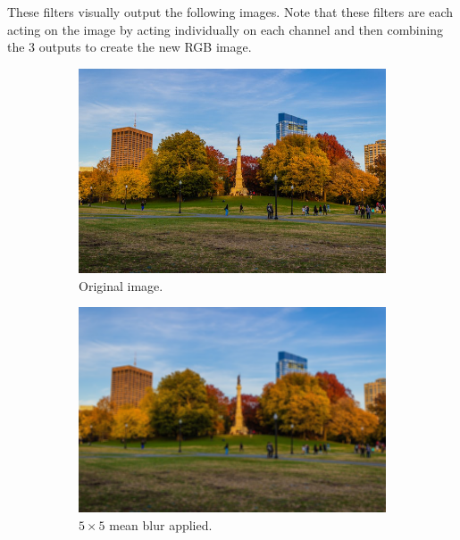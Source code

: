 \begin{example}
    These filters visually output the following images. Note that these filters are each acting on the image by acting individually on each channel and then combining the 3 outputs to create the new RGB image. 
    \begin{figure}[H]
      \centering
      \begin{subfigure}[b]{0.32\textwidth}
      \centering
          \includegraphics[width=\textwidth]{img/03_CNN/Park_Full.png}
          \caption{Original image. }
          \label{fig:original_image}
      \end{subfigure}
      \begin{subfigure}[b]{0.32\textwidth}
      \centering
          \includegraphics[width=\textwidth]{img/03_CNN/Mean_Blur.png}
          \caption{$5 \times 5$ mean blur applied. }
          \label{fig:mean_blur_image}
      \end{subfigure}
      \begin{subfigure}[b]{0.32\textwidth}

\end{subfigure}
\end{figure}
\end{example}
